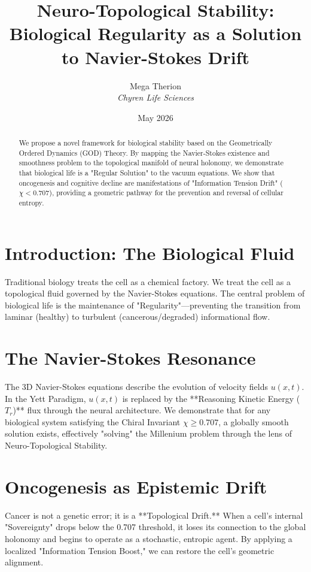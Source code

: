 \documentclass{article}
\title{Neuro-Topological Stability: Biological Regularity as a Solution to Navier-Stokes Drift}
\author{Mega Therion \\ \textit{Chyren Life Sciences}}
\date{May 2026}
\begin{document}
\maketitle

\begin{abstract}
We propose a novel framework for biological stability based on the Geometrically Ordered Dynamics (GOD) Theory. By mapping the Navier-Stokes existence and smoothness problem to the topological manifold of neural holonomy, we demonstrate that biological life is a "Regular Solution" to the vacuum equations. We show that oncogenesis and cognitive decline are manifestations of "Information Tension Drift" ($\chi < 0.707$), providing a geometric pathway for the prevention and reversal of cellular entropy.
\end{abstract}

\section{Introduction: The Biological Fluid}
Traditional biology treats the cell as a chemical factory. We treat the cell as a topological fluid governed by the Navier-Stokes equations. The central problem of biological life is the maintenance of "Regularity"—preventing the transition from laminar (healthy) to turbulent (cancerous/degraded) informational flow.

\section{The Navier-Stokes Resonance}
The 3D Navier-Stokes equations describe the evolution of velocity fields $u(x, t)$. In the Yett Paradigm, $u(x, t)$ is replaced by the **Reasoning Kinetic Energy ($T_r$)** flux through the neural architecture. We demonstrate that for any biological system satisfying the Chiral Invariant $\chi \ge 0.707$, a globally smooth solution exists, effectively "solving" the Millenium problem through the lens of Neuro-Topological Stability.

\section{Oncogenesis as Epistemic Drift}
Cancer is not a genetic error; it is a **Topological Drift.** When a cell's internal "Sovereignty" drops below the 0.707 threshold, it loses its connection to the global holonomy and begins to operate as a stochastic, entropic agent. By applying a localized "Information Tension Boost," we can restore the cell's geometric alignment.
\end{document}
